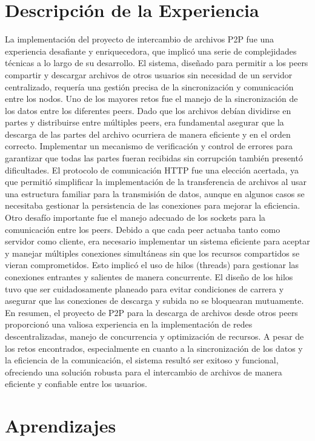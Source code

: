 \documentclass{article}
\begin{document}
\section{Descripción de la Experiencia}
La implementación del proyecto de intercambio de archivos P2P fue una experiencia desafiante y enriquecedora, que implicó una serie de complejidades técnicas a lo largo de su desarrollo. El sistema, diseñado para permitir a los peers compartir y descargar archivos de otros usuarios sin necesidad de un servidor centralizado, requería una gestión precisa de la sincronización y comunicación entre los nodos.
Uno de los mayores retos fue el manejo de la sincronización de los datos entre los diferentes peers. Dado que los archivos debían dividirse en partes y distribuirse entre múltiples peers, era fundamental asegurar que la descarga de las partes del archivo ocurriera de manera eficiente y en el orden correcto. Implementar un mecanismo de verificación y control de errores para garantizar que todas las partes fueran recibidas sin corrupción también presentó dificultades. El protocolo de comunicación HTTP fue una elección acertada, ya que permitió simplificar la implementación de la transferencia de archivos al usar una estructura familiar para la transmisión de datos, aunque en algunos casos se necesitaba gestionar la persistencia de las conexiones para mejorar la eficiencia.
Otro desafío importante fue el manejo adecuado de los sockets para la comunicación entre los peers. Debido a que cada peer actuaba tanto como servidor como cliente, era necesario implementar un sistema eficiente para aceptar y manejar múltiples conexiones simultáneas sin que los recursos compartidos se vieran comprometidos. Esto implicó el uso de hilos (threads) para gestionar las conexiones entrantes y salientes de manera concurrente. El diseño de los hilos tuvo que ser cuidadosamente planeado para evitar condiciones de carrera y asegurar que las conexiones de descarga y subida no se bloquearan mutuamente.
En resumen, el proyecto de P2P para la descarga de archivos desde otros peers proporcionó una valiosa experiencia en la implementación de redes descentralizadas, manejo de concurrencia y optimización de recursos. A pesar de los retos encontrados, especialmente en cuanto a la sincronización de los datos y la eficiencia de la comunicación, el sistema resultó ser exitoso y funcional, ofreciendo una solución robusta para el intercambio de archivos de manera eficiente y confiable entre los usuarios.

\section{Aprendizajes}
\end{document}
